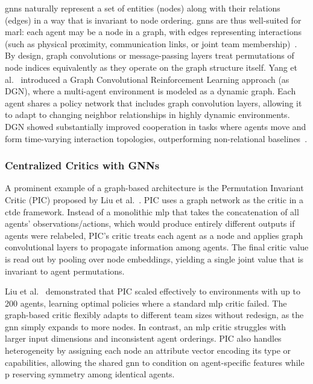 \documentclass{article}
\begin{document}
\Glspl{gnn} naturally represent a set of entities (nodes) along with 
their relations (edges) in a way that is invariant to node ordering. 
\Glspl{gnn} are thus well-suited for \gls{marl}: each agent may be a node in a graph, 
with edges representing interactions (such as physical proximity, 
communication links, or joint team membership)~\cite{liu2020b}. 
By design, graph convolutions or message-passing layers treat permutations of 
node indices equivalently as they operate on the graph structure itself. 
Yang et al.~\cite{yang2021a} introduced a Graph Convolutional Reinforcement Learning 
approach (as DGN), where a multi-agent environment is modeled as a dynamic graph. 
Each agent shares a policy network that includes graph convolution layers, 
allowing it to adapt to changing neighbor relationships in highly dynamic environments. 
DGN showed substantially improved cooperation in tasks where agents move and form time-varying 
interaction topologies, outperforming non-relational baselines~\cite{yang2021a}. 

\subsubsection{Centralized Critics with GNNs}
A prominent example of a graph-based architecture is the Permutation 
Invariant Critic (PIC) proposed by Liu et al.~\cite{liu2020b}. 
PIC uses a graph network as the critic in a \gls{ctde} framework. 
Instead of a monolithic \gls{mlp} that takes the concatenation of 
all agents' observations/actions, which would produce entirely different 
outputs if agents were relabeled, PIC's critic treats each agent as a node 
and applies graph convolutional layers to propagate information among agents. 
The final critic value is read out by pooling over node embeddings, 
yielding a single joint value that is invariant to agent permutations. 

Liu et al.~\cite{liu2020b} demonstrated that PIC scaled effectively 
to environments with up to 200 agents, learning optimal policies where 
a standard \gls{mlp} critic failed. The graph-based critic flexibly adapts to 
different team sizes without redesign, as the \gls{gnn} simply expands to more nodes. 
In contrast, an \gls{mlp} critic struggles with larger input dimensions 
and inconsistent agent orderings. PIC also handles heterogeneity by 
assigning each node an attribute vector encoding its type or capabilities, 
allowing the shared \gls{gnn} to condition on agent-specific features while p
reserving symmetry among identical agents.
\end{document}
